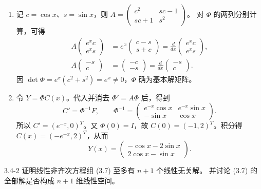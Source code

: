 \documentclass[UTF8,a4paper,11pt]{ctexart}
\newcommand{\e}{\mathrm e}
\begin{document}
\begin{solution}
\begin{enumerate}[label=(\arabic*)]
\item 记 $c=\cos x$、$s=\sin x$，则 $A=\begin{pmatrix}c^2&sc-1\\sc+1&s^2\end{pmatrix}$。
对 $\Phi$ 的两列分别计算，可得
\[
\begin{aligned}
A\begin{pmatrix}e^xc\\e^xs\end{pmatrix}
&=e^x\begin{pmatrix}c-s\\s+c\end{pmatrix}
=\frac{d}{dx}\begin{pmatrix}e^xc\\e^xs\end{pmatrix},\\[4pt]
A\begin{pmatrix}-s\\c\end{pmatrix}
&=\begin{pmatrix}-c\\-s\end{pmatrix}
=\frac{d}{dx}\begin{pmatrix}-s\\c\end{pmatrix}.
\end{aligned}
\]
因 $\det\Phi=e^x(c^2+s^2)=e^x\ne0$，$\Phi$ 确为基本解矩阵。
\item 令 $Y=\Phi C(x)$。代入并消去 $\Phi'=A\Phi$ 后，得到
\[
C'=\Phi^{-1}F,\qquad
\Phi^{-1}=\begin{pmatrix}e^{-x}\cos x&e^{-x}\sin x\\-\sin x&\cos x\end{pmatrix}.
\]
所以 $C'=(e^{-x},0)^T$。又 $\Phi(0)=I$，故 $C(0)=(-1,2)^T$。积分得
$C(x)=(-e^{-x},2)^T$，从而
\[
\boxed{Y(x)=\begin{pmatrix}-\cos x-2\sin x\\2\cos x-\sin x\end{pmatrix}}.
\]
\end{enumerate}
\end{solution}

\begin{problem}{3.4-2}
证明线性非齐次方程组 (3.7) 至多有 $n+1$ 个线性无关解。
  并讨论 (3.7) 的全部解是否构成 $n+1$ 维线性空间。
\end{problem}
\end{document}
